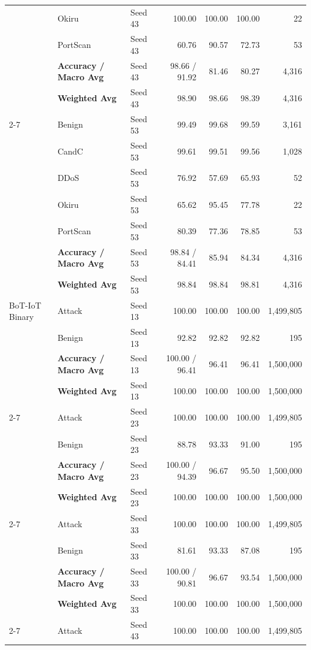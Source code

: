 \documentclass[a4paper,fleqn]{cas-sc}
\begin{document}
{\begin{landscape}
\begin{longtable}{lllrrrr}
 & Okiru & Seed 43 & 100.00 & 100.00 & 100.00 & 22 \\
 & PortScan & Seed 43 & 60.76 & 90.57 & 72.73 & 53 \\
 & \textbf{Accuracy / Macro Avg} & Seed 43 & 98.66 / 91.92 & 81.46 & 80.27 & 4,316 \\
 & \textbf{Weighted Avg} & Seed 43 & 98.90 & 98.66 & 98.39 & 4,316 \\
\cline{2-7}
 & Benign & Seed 53 & 99.49 & 99.68 & 99.59 & 3,161 \\
 & CandC & Seed 53 & 99.61 & 99.51 & 99.56 & 1,028 \\
 & DDoS & Seed 53 & 76.92 & 57.69 & 65.93 & 52 \\
 & Okiru & Seed 53 & 65.62 & 95.45 & 77.78 & 22 \\
 & PortScan & Seed 53 & 80.39 & 77.36 & 78.85 & 53 \\
 & \textbf{Accuracy / Macro Avg} & Seed 53 & 98.84 / 84.41 & 85.94 & 84.34 & 4,316 \\
 & \textbf{Weighted Avg} & Seed 53 & 98.84 & 98.84 & 98.81 & 4,316 \\
\midrule
BoT-IoT Binary & Attack & Seed 13 & 100.00 & 100.00 & 100.00 & 1,499,805 \\
 & Benign & Seed 13 & 92.82 & 92.82 & 92.82 & 195 \\
 & \textbf{Accuracy / Macro Avg} & Seed 13 & 100.00 / 96.41 & 96.41 & 96.41 & 1,500,000 \\
 & \textbf{Weighted Avg} & Seed 13 & 100.00 & 100.00 & 100.00 & 1,500,000 \\
\cline{2-7}
 & Attack & Seed 23 & 100.00 & 100.00 & 100.00 & 1,499,805 \\
 & Benign & Seed 23 & 88.78 & 93.33 & 91.00 & 195 \\
 & \textbf{Accuracy / Macro Avg} & Seed 23 & 100.00 / 94.39 & 96.67 & 95.50 & 1,500,000 \\
 & \textbf{Weighted Avg} & Seed 23 & 100.00 & 100.00 & 100.00 & 1,500,000 \\
\cline{2-7}
 & Attack & Seed 33 & 100.00 & 100.00 & 100.00 & 1,499,805 \\
 & Benign & Seed 33 & 81.61 & 93.33 & 87.08 & 195 \\
 & \textbf{Accuracy / Macro Avg} & Seed 33 & 100.00 / 90.81 & 96.67 & 93.54 & 1,500,000 \\
 & \textbf{Weighted Avg} & Seed 33 & 100.00 & 100.00 & 100.00 & 1,500,000 \\
\cline{2-7}
 & Attack & Seed 43 & 100.00 & 100.00 & 100.00 & 1,499,805 \\

\end{longtable}
\end{landscape}}
\end{document}
